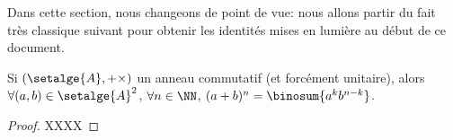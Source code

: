Dans cette section, nous changeons de point de vue: nous allons partir du fait très classique suivant pour obtenir les identités mises en lumière au début de ce document.




\begin{fact} \label{bino-id}
	Si $(\setalge{A}, + \times)$ un anneau commutatif (et forcément unitaire),
	alors
	$\forall (a, b) \in \setalge{A}^2$,
	$\forall n \in \NN$,
	$(a + b)^n = \binosum{a^k b^{n-k}}$. 
\end{fact}


\begin{proof}
    XXXX
\end{proof}